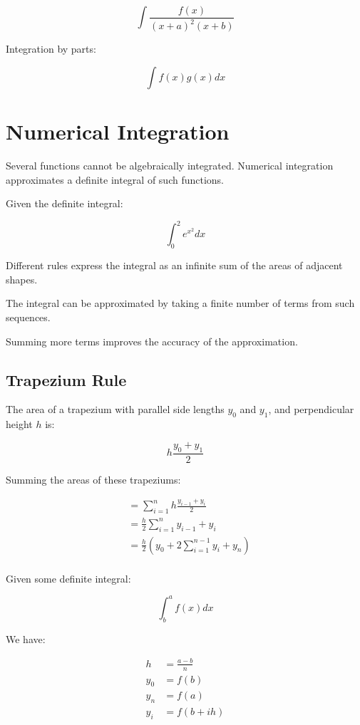 \documentclass[a4paper,11pt]{report}
\begin{document}
$$
\int \frac{f(x)}{(x + a)^2 (x + b)}
$$

Integration by parts:

$$
\int f(x)g(x) dx
$$


\section{Numerical Integration}

Several functions cannot be algebraically integrated.
Numerical integration approximates a definite integral of such functions.

Given the definite integral:

$$
\int^2_0 e^{x^2} dx
$$

Different rules express the integral as an infinite sum of the areas of adjacent
shapes.

The integral can be approximated by taking a finite number of terms from such
sequences.

Summing more terms improves the accuracy of the approximation.

\subsection{Trapezium Rule}

The area of a trapezium with parallel side lengths $y_0$ and $y_1$, and
perpendicular height $h$ is:

$$
h\frac{y_0 + y_1}{2}
$$

Summing the areas of these trapeziums:

$$
\begin{aligned}
& = \sum_{i = 1}^n h\frac{y_{i - 1} + y_i}{2} \\
& = \frac{h}{2} \sum_{i = 1}^n y_{i - 1} + y_i \\
& = \frac{h}{2} (y_0 + 2\sum_{i = 1}^{n - 1} y_i + y_n) \\
\end{aligned}
$$

Given some definite integral:

$$
\int^a_b f(x) dx
$$

We have:

$$
\begin{aligned}
h & = \frac{a - b}{n} \\
y_0 & = f(b) \\
y_n & = f(a) \\
y_i & = f(b + ih) \\
\end{aligned}
$$
\end{document}
